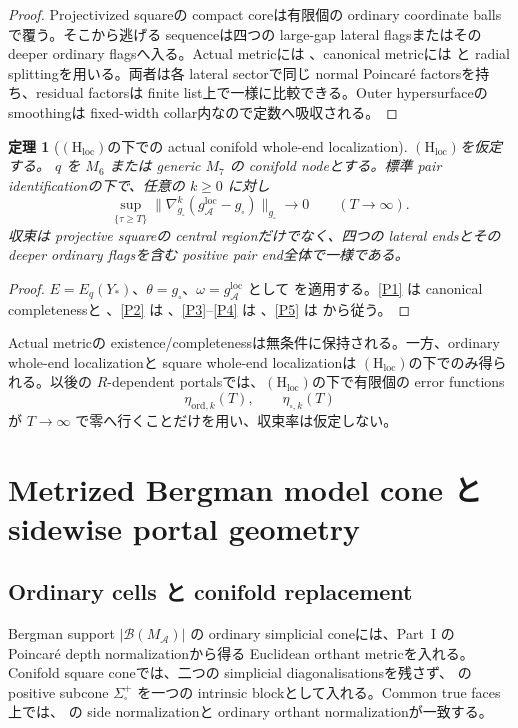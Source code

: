 \documentclass[11pt,a4paper]{ltjsarticle}
\newcommand{\cA}{\mathcal A}\newcommand{\cB}{\mathcal B}\newcommand{\cC}{\mathcal C}
\newcommand{\Sigplus}{\Sigma_{\square}^{+}}
\newcommand{\gsq}{g_{\square}}\newcommand{\omsq}{\omega_{\square}}
\newcommand{\Hloc}{\ensuremath{(\mathrm H_{\mathrm{loc}})}}
\theoremstyle{plain}
\newtheorem{theorem}{定理}[section]\newtheorem{proposition}[theorem]{命題}
\theoremstyle{definition}
\theoremstyle{remark}
\begin{document}
\begin{proof}
Projectivized squareの compact coreは有限個の ordinary coordinate ballsで覆う。そこから逃げる sequenceは四つの large-gap lateral flagsまたはその deeper ordinary flagsへ入る。Actual metricには 、canonical metricには  と radial splittingを用いる。両者は各 lateral sectorで同じ normal Poincar\'e factorsを持ち、residual factorsは finite list上で一様に比較できる。Outer hypersurfaceの smoothingは fixed-width collar内なので定数へ吸収される。
\end{proof}

\begin{theorem}[\Hloc の下での actual conifold whole-end localization]\label{thm:actual-square-localization}
\Hloc を仮定する。
$q$ を $M_6$ または generic $M_7$ の conifold nodeとする。標準 pair identificationの下で、任意の $k\ge0$ に対し
\[
 \sup_{\{\tau\ge T\}}
 \|\nabla_{\gsq}^k(g_{\cA}^{\mathrm{loc}}-\gsq)\|_{\gsq}
 \longrightarrow0
 \qquad(T\to\infty).
\]
収束は projective squareの central regionだけでなく、四つの lateral endsとその deeper ordinary flagsを含む positive pair end全体で一様である。
\end{theorem}

\begin{proof}
$E=E_q(Y_*)$、$\theta=\gsq$、$\omega=g_{\cA}^{\mathrm{loc}}$ として  を適用する。\ref{P1} は canonical completenessと 、\ref{P2} は 、\ref{P3}--\ref{P4} は 、\ref{P5} は  から従う。
\end{proof}

\begin{statusbox}
Actual metricの existence/completenessは無条件に保持される。一方、ordinary whole-end localizationと square whole-end localizationは \Hloc の下でのみ得られる。以後の $R$-dependent portalsでは、\Hloc の下で有限個の error functions
\[
 \eta_{\mathrm{ord},k}(T),\qquad \eta_{\square,k}(T)
\]
が $T\to\infty$ で零へ行くことだけを用い、収束率は仮定しない。
\end{statusbox}

\section{Metrized Bergman model cone と sidewise portal geometry}\label{sec:model-cone}

\subsection{Ordinary cells と conifold replacement}
Bergman support $|\mathcal B(M_{\cA})|$ の ordinary simplicial coneには、Part~I の Poincar\'e depth normalizationから得る Euclidean orthant metricを入れる。Conifold square coneでは、二つの simplicial diagonalisationsを残さず、 の positive subcone $\Sigplus$ を一つの intrinsic blockとして入れる。Common true faces上では、 の side normalizationと ordinary orthant normalizationが一致する。
\end{document}

